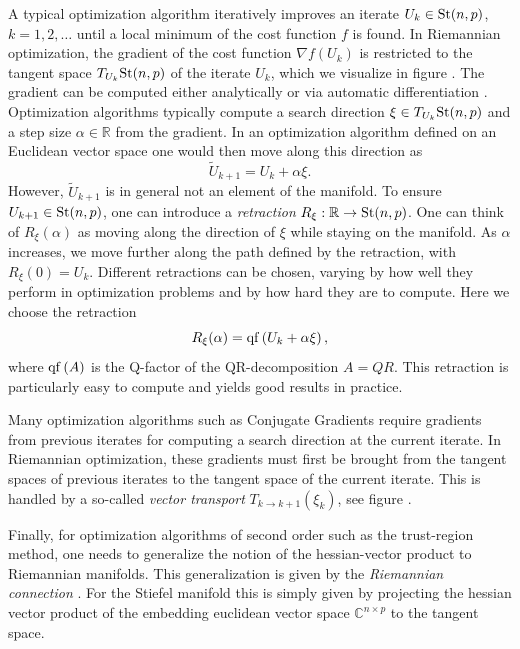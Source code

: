 A typical optimization algorithm iteratively improves an iterate $U_k\in\text{St}(n,p)$, $k=1,2,\dots$ until a local minimum of the cost function $f$ is found. In Riemannian optimization, the gradient of the cost function $\nabla f\left(U_k\right)$ is restricted to the tangent space $T_{U_k}\text{St}(n,p)$ of the iterate $U_k$, which we visualize in figure . The gradient can be computed either analytically or via automatic differentiation \cite{cite:riemannian_geometry_automatic_differentiation_quantum_physics, cite:pymanopt}. Optimization algorithms typically compute a search direction $\xi\in T_{U_k}\text{St}(n,p)$ and a step size $\alpha \in \mathbb{R}$ from the gradient. In an optimization algorithm defined on an Euclidean vector space one would then move along this direction as
\begin{equation}
	\tilde{U}_{k+1} = U_k + \alpha\xi.
\end{equation}
However, $\tilde{U}_{k+1}$ is in general not an element of the manifold. To ensure $U_{k+1}\in\text{St}(n,p)$, one can introduce a \textit{retraction} $R_\xi:\mathbb{R}\to\text{St}(n,p)$. One can think of $R_\xi\left(\alpha\right)$ as moving along the direction of $\xi$ while staying on the manifold. As $\alpha$ increases, we move further along the path defined by the retraction, with $R_\xi(0) = U_k$. Different retractions can be chosen, varying by how well they perform in optimization problems and by how hard they are to compute. Here we choose the retraction
\begin{equation}
	R_\xi(\alpha) = \operatorname{qf}\left(U_k + \alpha\xi\right),
\end{equation}
where $\operatorname{qf}\left(A\right)$ is the Q-factor of the QR-decomposition $A = QR$. This retraction is particularly easy to compute and yields good results in practice. \par
Many optimization algorithms such as Conjugate Gradients require gradients from previous iterates for computing a search direction at the current iterate. In Riemannian optimization, these gradients must first be brought from the tangent spaces of previous iterates to the tangent space of the current iterate. This is handled by a so-called \textit{vector transport} $T_{k\rightarrow k+1}\left(\xi_k\right)$, see figure . \par
Finally, for optimization algorithms of second order such as the trust-region method, one needs to generalize the notion of the hessian-vector product to Riemannian manifolds. This generalization is given by the \textit{Riemannian connection} \cite{cite:optimization_on_matrix_manifolds}. For the Stiefel manifold this is simply given by projecting the hessian vector product of the embedding euclidean vector space $\mathbb{C}^{n\times p}$ to the tangent space. \par
